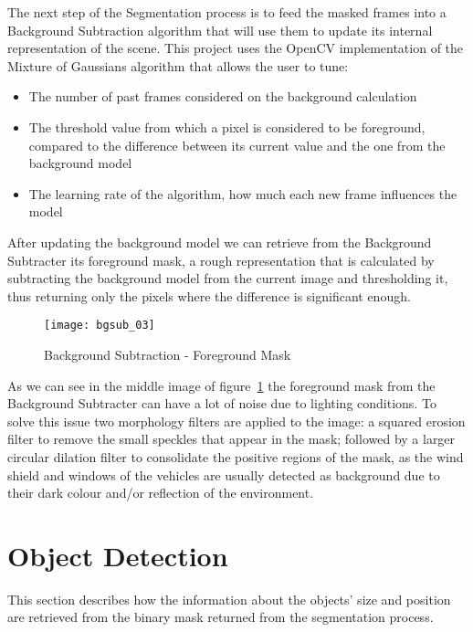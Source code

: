 The next step of the Segmentation process is to feed the masked frames into a Background Subtraction algorithm that will use them to update its internal representation of the scene. This project uses the OpenCV implementation of the Mixture of Gaussians algorithm that allows the user to tune:

\begin{itemize}
	\item The number of past frames considered on the background calculation
	\item The threshold value from which a pixel is considered to be foreground, compared to the difference between its current value and the one from the background model
	\item The learning rate of the algorithm, how much each new frame influences the model
\end{itemize}

After updating the background model we can retrieve from the Background Subtracter its foreground mask, a rough representation that is calculated by subtracting the background model from the current image and thresholding it, thus returning only the pixels where the difference is significant enough.

\begin{figure}[h]
  \begin{center}
    \leavevmode
    \texttt{[image: bgsub\_03]}
    \caption{Background Subtraction - Foreground Mask}
    \label{fig:bgsub_02}
  \end{center}
\end{figure}

As we can see in the middle image of figure~\ref{fig:bgsub_02} the foreground mask from the Background Subtracter can have a lot of noise due to lighting conditions. To solve this issue two morphology filters are applied to the image: a squared erosion filter to remove the small speckles that appear in the mask; followed by a larger circular dilation filter to consolidate the positive regions of the mask, as the wind shield and windows of the vehicles are usually detected as background due to their dark colour and/or reflection of the environment.

\section{Object Detection}

This section describes how the information about the objects' size and position are retrieved from the binary mask returned from the segmentation process. 

